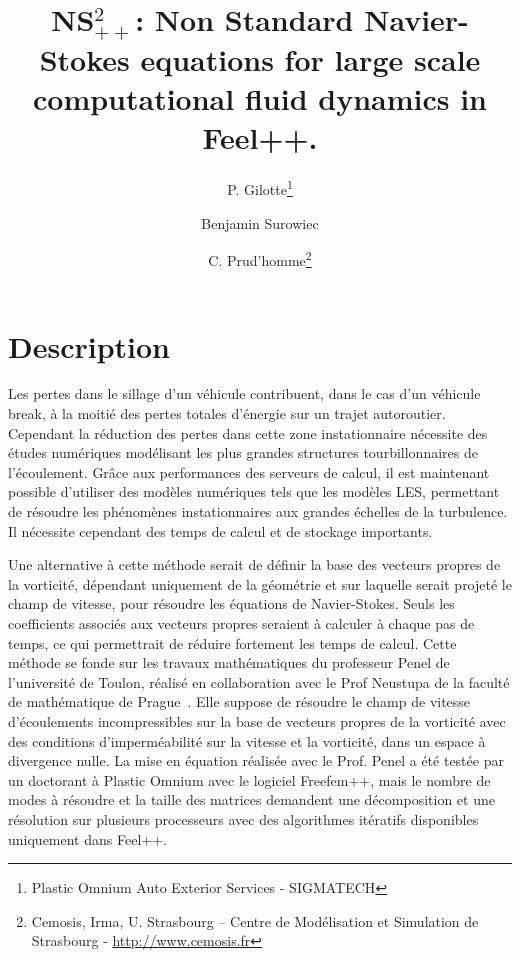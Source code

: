 \documentclass[12pt]{article}
\title{NS$^2_{++}$: Non Standard Navier-Stokes equations for large scale
computational fluid dynamics in Feel++.}
\author{P. Gilotte\thanks{Plastic Omnium Auto Exterior Services - SIGMATECH}
\and Benjamin Surowiec\footnotemark[1] \and C. Prud'homme\thanks{Cemosis, Irma,
U. Strasbourg -- Centre de Modélisation et Simulation de Strasbourg -
\url{http://www.cemosis.fr}} }
\begin{document}
\maketitle


\section{Description}
\label{sec:description}

Les pertes dans le sillage d’un véhicule contribuent, dans le cas d’un véhicule
break, à la moitié des pertes totales d’énergie sur un trajet
autoroutier. Cependant la réduction des pertes dans cette zone instationnaire
nécessite des études numériques modélisant les plus grandes structures
tourbillonnaires de l’écoulement. Grâce aux performances des serveurs de calcul,
il est maintenant possible d’utiliser des modèles numériques tels que les
modèles LES, permettant de résoudre les phénomènes instationnaires aux grandes
échelles de la turbulence. Il nécessite cependant des temps de calcul et de
stockage importants.

Une alternative à cette méthode serait de définir la base des vecteurs propres
de la vorticité, dépendant uniquement de la géométrie et sur laquelle serait
projeté le champ de vitesse, pour résoudre les équations de Navier-Stokes. Seuls
les coefficients associés aux vecteurs propres seraient à calculer à chaque pas
de temps, ce qui permettrait de réduire fortement les temps de calcul. Cette
méthode se fonde sur les travaux mathématiques du professeur Penel de
l’université de Toulon, réalisé en collaboration avec le Prof Neustupa de la
faculté de mathématique de Prague~\cite{Penel2004}. Elle suppose de résoudre le
champ de vitesse d’écoulements incompressibles sur la base de vecteurs
propres de la vorticité avec des conditions d’imperméabilité sur la vitesse et
la vorticité, dans un espace à divergence nulle. La mise en équation réalisée
avec le Prof. Penel a été testée par un doctorant à Plastic Omnium avec le
logiciel Freefem++, mais le nombre de modes à résoudre et la taille des matrices
demandent une décomposition et une résolution sur plusieurs processeurs avec des
algorithmes itératifs disponibles uniquement dans Feel++.
\end{document}
